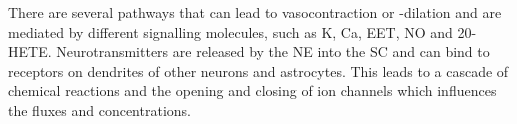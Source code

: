 There are several pathways that can lead to vasocontraction or -dilation and are mediated by different signalling molecules, such as \gls{K}, \gls{Ca}, EET, \gls{NO} and 20-HETE. Neurotransmitters are released by the \gls{NE} into the \gls{SC} and can bind to receptors on dendrites of other neurons and astrocytes. This leads to a cascade of chemical reactions and the opening and closing of ion channels which influences the fluxes and concentrations.

%
%
% 
% 
%


